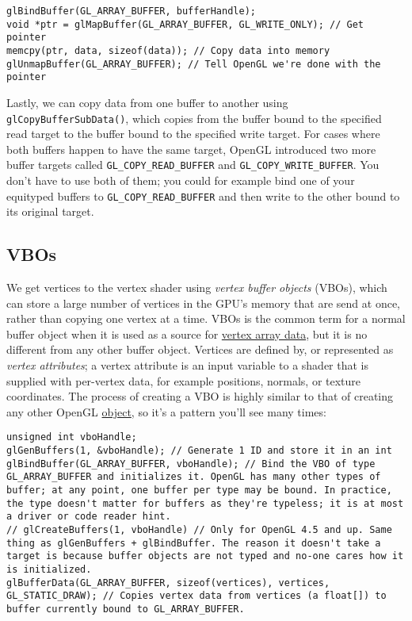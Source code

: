 \documentclass[8pt, table, xcdraw]{article}%
\begin{document}
\begin{lstlisting}
glBindBuffer(GL_ARRAY_BUFFER, bufferHandle);
void *ptr = glMapBuffer(GL_ARRAY_BUFFER, GL_WRITE_ONLY); // Get pointer
memcpy(ptr, data, sizeof(data)); // Copy data into memory
glUnmapBuffer(GL_ARRAY_BUFFER); // Tell OpenGL we're done with the pointer
\end{lstlisting}

Lastly, we can copy data from one buffer to another using \lstinline{glCopyBufferSubData()}, which copies from the buffer bound to the specified read target to the buffer bound to the specified write target. For cases where both buffers happen to have the same target, OpenGL introduced two more buffer targets called \lstinline{GL_COPY_READ_BUFFER} and \lstinline{GL_COPY_WRITE_BUFFER}. You don't have to use both of them; you could for example bind one of your equityped buffers to \lstinline{GL_COPY_READ_BUFFER} and then write to the other bound to its original target.

\subsection{VBOs} \label{vbos}

We get vertices to the vertex shader using \emph{vertex buffer objects} (VBOs), which can store a large number of vertices in the GPU's memory that are send at once, rather than copying one vertex at a time. VBOs is the common term for a normal buffer object when it is used as a source for \hyperref[vaos]{vertex array data}, but it is no different from any other buffer object. Vertices are defined by, or represented as \emph{vertex attributes}; a vertex attribute is an input variable to a shader that is supplied with per-vertex data, for example positions, normals, or texture coordinates. The process of creating a VBO is highly similar to that of creating any other OpenGL \hyperref[intro]{object}, so it's a pattern you'll see many times:

\begin{lstlisting}
unsigned int vboHandle;
glGenBuffers(1, &vboHandle); // Generate 1 ID and store it in an int
glBindBuffer(GL_ARRAY_BUFFER, vboHandle); // Bind the VBO of type GL_ARRAY_BUFFER and initializes it. OpenGL has many other types of buffer; at any point, one buffer per type may be bound. In practice, the type doesn't matter for buffers as they're typeless; it is at most a driver or code reader hint.
// glCreateBuffers(1, vboHandle) // Only for OpenGL 4.5 and up. Same thing as glGenBuffers + glBindBuffer. The reason it doesn't take a target is because buffer objects are not typed and no-one cares how it is initialized.
glBufferData(GL_ARRAY_BUFFER, sizeof(vertices), vertices, GL_STATIC_DRAW); // Copies vertex data from vertices (a float[]) to buffer currently bound to GL_ARRAY_BUFFER.
\end{lstlisting}
\end{document}
